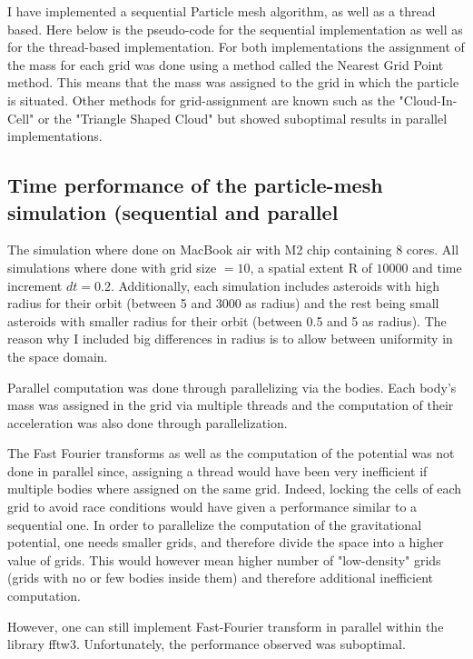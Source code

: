 \documentclass{article}
\begin{document}
I have implemented a sequential Particle mesh algorithm, as well as a thread based. 
Here below is the pseudo-code for the sequential implementation as well as for the thread-based implementation. 
For both implementations the assignment of the mass for each grid was done using a method called the Nearest Grid Point method. This means that the mass was assigned to the grid in which the particle is situated. Other methods for grid-assignment are known such as the "Cloud-In-Cell" or the "Triangle Shaped Cloud" but showed suboptimal results in parallel implementations. 

\subsection{Time performance of the particle-mesh simulation (sequential and parallel}
The simulation where done on MacBook air with M2 chip containing 8 cores.
All simulations where done with grid size $= 10$, a spatial extent R of $10 000$ and time increment $dt = 0.2$. Additionally, each simulation includes asteroids with high radius for their orbit (between 5 and 3000  as radius)  and the rest being small asteroids with smaller radius for their orbit (between 0.5 and 5 as radius). The reason why I included big differences in radius is to allow between uniformity in the space domain. 

Parallel computation was done through parallelizing via the bodies. Each body's mass was assigned in the grid via multiple threads and the computation of their acceleration was also done through parallelization. 

The Fast Fourier transforms as well as the computation of the potential was not done in parallel since, assigning a thread would have been very inefficient if multiple bodies where assigned on the same grid. Indeed, locking the cells of each grid to avoid race conditions would have given a performance similar to a sequential one. In order to parallelize the computation of the gravitational potential, one needs smaller grids, and therefore divide the space into a higher value of grids. This would however mean higher number of "low-density" grids (grids with no or few bodies inside them) and therefore additional inefficient computation. 

However, one can still implement Fast-Fourier transform in parallel within the library fftw3. Unfortunately, the performance observed was suboptimal. 
\end{document}
